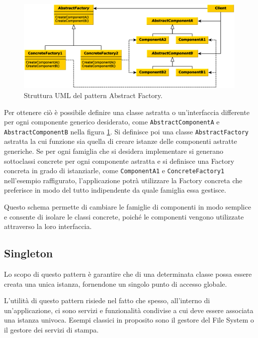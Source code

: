 \begin{figure}
\begin{center}
\includegraphics[width=13cm]{Immagini/AbstractFactoryPattern}
\caption{Struttura UML del pattern Abstract Factory.\label{f:abstractfactorypattern}} 
\end{center} 
\end{figure}

Per ottenere ci\`o \`e possibile definire una classe astratta o un'interfaccia differente per ogni componente generico desiderato, come \texttt{AbstractComponentA} e \texttt{AbstractComponentB} nella figura \ref{f:abstractfactorypattern}.
Si definisce poi una classe \texttt{AbstractFactory} astratta la cui funzione sia quella di creare istanze delle componenti astratte generiche. Se per ogni famiglia che si desidera implementare si generano sottoclassi concrete per ogni componente astratta e si definisce una Factory concreta in grado di istanziarle, come \texttt{ComponentA1} e \texttt{ConcreteFactory1} nell'esempio raffigurato, l'applicazione potr\`a utilizzare la Factory concreta che preferisce in modo del tutto indipendente da quale famiglia essa gestisce.

Questo schema permette di cambiare le famiglie di componenti in modo semplice e consente di isolare le classi concrete, poich\'e le componenti vengono utilizzate attraverso la loro interfaccia.

\subsection{Singleton}
\label{sub:singleton}
Lo scopo di questo pattern \`e garantire che di una determinata classe possa essere creata una unica istanza, fornendone un singolo punto di accesso globale.

L'utilit\`a di questo pattern risiede nel fatto che spesso, all'interno di un'applicazione, ci sono servizi e funzionalit\`a condivise a cui deve essere associata una istanza univoca. Esempi classici in proposito sono il gestore del File System o il gestore dei servizi di stampa.

